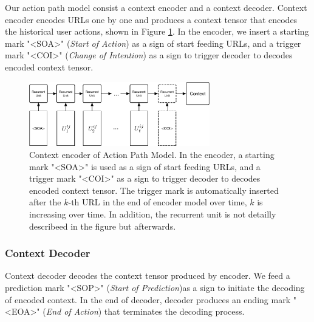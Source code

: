 Our action path model consist a context encoder and a context decoder. Context encoder
encodes URLs one by one and produces a context tensor that encodes the historical user actions, 
shown in Figure \ref{fig:encoder}. In the encoder, we insert a starting mark "<SOA>" (\emph{Start of Action})
as a sign of start feeding URLs, and a trigger mark "<COI>" (\emph{Change of Intention}) as
a sign to trigger decoder to decodes encoded context tensor.

\begin{figure}[H]
    \centering
    \includegraphics[width=0.7\textwidth]{figures/encoder}
    \caption{Context encoder of Action Path Model. In the encoder, 
    a starting mark "<SOA>" is used as a sign of start feeding URLs, 
    and a trigger mark "<COI>" as
    a sign to trigger decoder to decodes encoded context tensor.
    The trigger mark is automatically inserted after the $k$-th URL in the end
    of encoder model over time, $k$ is increasing over time.
    In addition, the recurrent unit is not detailly describeed in the figure but afterwards.}
    \label{fig:encoder}
\end{figure}

\subsubsection{Context Decoder}

Context decoder decodes the context tensor produced by encoder. We feed a prediction mark
"<SOP>" (\emph{Start of Prediction})as a sign to initiate the decoding of encoded context.
In the end of decoder, decoder produces an ending mark "<EOA>" (\emph{End of Action}) that
terminates the decoding process.

